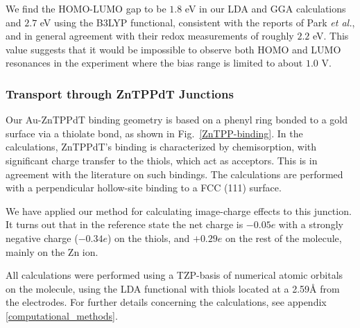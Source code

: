 \documentclass[aip,jcp,a4paper,reprint,floatfix,superscriptaddress]{revtex4-1}
\newcommand{\etal}{\emph{et al.}\xspace}
\begin{document}
We find  the HOMO-LUMO gap to be $1.8$ eV in our LDA and GGA calculations and $2.7$ eV using the B3LYP functional, consistent with the reports of Park \etal\cite{Park2008}, and in general agreement with their redox measurements of roughly $2.2$ eV. This value suggests that it would be impossible to observe both HOMO and LUMO resonances in the experiment where the bias range is limited to about $1.0$ V.








\subsubsection{Transport through ZnTPPdT Junctions}\label{transport}


Our Au-ZnTPPdT binding geometry is based on a phenyl ring bonded to a gold surface via a thiolate bond,\cite{Nara2004,Andrews2006,Kondo2006,Pontes2011} as shown in Fig.~\ref{ZnTPP-binding}. In the calculations, ZnTPPdT's binding is characterized by chemisorption, with significant charge transfer to the thiols, which act as acceptors. This is in agreement with the literature on such bindings.\cite{Xue2003a,Xue2003b,Love2005,Hoft2006,Romaner2006} The calculations are performed with a perpendicular hollow-site binding to a FCC (111) surface. 

We have applied our method for calculating image-charge effects to this junction. It turns out that in the reference state the net charge is $-0.05e$ with a strongly negative charge ($-0.34e$) on the thiols, and $+0.29e$ on the rest of the molecule, mainly on the Zn ion.

All calculations were performed using a TZP-basis of numerical atomic orbitals on the molecule, using the LDA functional  with thiols located at a 2.59\AA\xspace from the electrodes. For further details concerning the calculations, see appendix \ref{computational_methods}.\\
\end{document}
